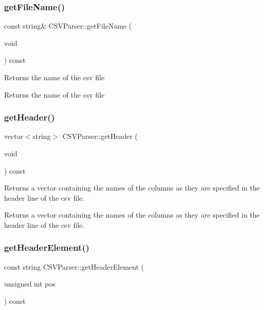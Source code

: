 \subsubsection{\texorpdfstring{get\+File\+Name()}{getFileName()}}
{\footnotesize\ttfamily const string\& C\+S\+V\+Parser\+::get\+File\+Name (\begin{DoxyParamCaption}\item[{void}]{ }\end{DoxyParamCaption}) const}

Returns the name of the csv file \begin{DoxyReturn}{Returns}
the name of the csv file 
\end{DoxyReturn}
\mbox{\label{class_c_s_v_parser_a95b7d4b188facfec7ebab65413f0130b}} 
\subsubsection{\texorpdfstring{get\+Header()}{getHeader()}}
{\footnotesize\ttfamily vector$<$string$>$ C\+S\+V\+Parser\+::get\+Header (\begin{DoxyParamCaption}\item[{void}]{ }\end{DoxyParamCaption}) const}

Returns a vector containing the names of the columns as they are specified in the header line of the csv file. \begin{DoxyReturn}{Returns}
a vector containing the names of the columns as they are specified in the header line of the csv file. 
\end{DoxyReturn}
\mbox{\label{class_c_s_v_parser_ad58dc7b467216ecb75f3bea681af3051}} 
\subsubsection{\texorpdfstring{get\+Header\+Element()}{getHeaderElement()}}
{\footnotesize\ttfamily const string C\+S\+V\+Parser\+::get\+Header\+Element (\begin{DoxyParamCaption}\item[{unsigned int}]{pos }\end{DoxyParamCaption}) const}

